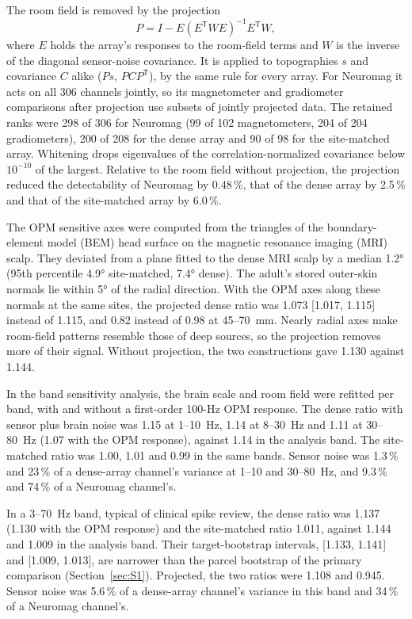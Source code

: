 \documentclass[preprint,12pt,authoryear,a4paper]{elsarticle}
\begin{document}
The room field is removed by the projection
\begin{equation}
P = I - E\left(E^{\mathsf{T}} W E\right)^{-1} E^{\mathsf{T}} W,
\label{eq:S-projection}
\end{equation}
where $E$ holds the array's responses to the room-field terms and $W$ is the inverse of the diagonal sensor-noise covariance. It is applied to topographies $s$ and covariance $C$ alike ($Ps$, $PCP^{\mathsf{T}}$), by the same rule for every array. For Neuromag it acts on all 306 channels jointly, so its magnetometer and gradiometer comparisons after projection use subsets of jointly projected data. The retained ranks were 298 of 306 for Neuromag (99 of 102 magnetometers, 204 of 204 gradiometers), 200 of 208 for the dense array and 90 of 98 for the site-matched array. Whitening drops eigenvalues of the correlation-normalized covariance below $10^{-10}$ of the largest. Relative to the room field without projection, the projection reduced the detectability of Neuromag by 0.48\,\%, that of the dense array by 2.5\,\% and that of the site-matched array by 6.0\,\%.

The OPM sensitive axes were computed from the triangles of the boundary-element model (BEM) head surface on the magnetic resonance imaging (MRI) scalp. They deviated from a plane fitted to the dense MRI scalp by a median 1.2° (95th percentile 4.9° site-matched, 7.4° dense). The adult's stored outer-skin normals lie within 5° of the radial direction. With the OPM axes along these normals at the same sites, the projected dense ratio was 1.073 [1.017, 1.115] instead of 1.115, and 0.82 instead of 0.98 at 45--70~mm. Nearly radial axes make room-field patterns resemble those of deep sources, so the projection removes more of their signal. Without projection, the two constructions gave 1.130 against 1.144.

In the band sensitivity analysis, the brain scale and room field were refitted per band, with and without a first-order 100-Hz OPM response. The dense ratio with sensor plus brain noise was 1.15 at 1–10~Hz, 1.14 at 8–30~Hz and 1.11 at 30–80~Hz (1.07 with the OPM response), against 1.14 in the analysis band. The site-matched ratio was 1.00, 1.01 and 0.99 in the same bands. Sensor noise was 1.3\,\% and 23\,\% of a dense-array channel's variance at 1–10 and 30–80~Hz, and 9.3\,\% and 74\,\% of a Neuromag channel's.

In a 3–70~Hz band, typical of clinical spike review, the dense ratio was 1.137 (1.130 with the OPM response) and the site-matched ratio 1.011, against 1.144 and 1.009 in the analysis band. Their target-bootstrap intervals, [1.133, 1.141] and [1.009, 1.013], are narrower than the parcel bootstrap of the primary comparison (Section~\ref{sec:S1}). Projected, the two ratios were 1.108 and 0.945. Sensor noise was 5.6\,\% of a dense-array channel's variance in this band and 34\,\% of a Neuromag channel's.
\end{document}
